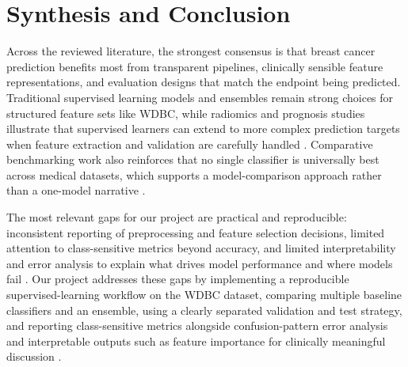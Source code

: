 \documentclass[conference]{IEEEtran}
\begin{document}
\section{Synthesis and Conclusion}
Across the reviewed literature, the strongest consensus is that breast cancer prediction benefits most from transparent pipelines, clinically sensible feature representations, and evaluation designs that match the endpoint being predicted. Traditional supervised learning models and ensembles remain strong choices for structured feature sets like WDBC, while radiomics and prognosis studies illustrate that supervised learners can extend to more complex prediction targets when feature extraction and validation are carefully handled \cite{b11,b18,b14,b15}. Comparative benchmarking work also reinforces that no single classifier is universally best across medical datasets, which supports a model-comparison approach rather than a one-model narrative \cite{b10}.

The most relevant gaps for our project are practical and reproducible: inconsistent reporting of preprocessing and feature selection decisions, limited attention to class-sensitive metrics beyond accuracy, and limited interpretability and error analysis to explain what drives model performance and where models fail \cite{b7,b8}. Our project addresses these gaps by implementing a reproducible supervised-learning workflow on the WDBC dataset, comparing multiple baseline classifiers and an ensemble, using a clearly separated validation and test strategy, and reporting class-sensitive metrics alongside confusion-pattern error analysis and interpretable outputs such as feature importance for clinically meaningful discussion \cite{b12,b11,b18}.
\end{document}
